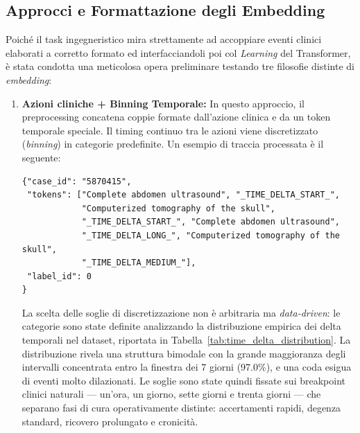 \subsection{Approcci e Formattazione degli Embedding}
Poiché il task ingegneristico mira strettamente ad accoppiare eventi clinici elaborati a corretto formato ed interfacciandoli poi col \textit{Learning} del Transformer, è stata condotta una meticolosa opera preliminare testando tre filosofie distinte di \textit{embedding}:

\begin{enumerate}
    \item \textbf{Azioni cliniche + Binning Temporale:} In questo approccio, il preprocessing concatena coppie formate dall'azione clinica e da un token temporale speciale. Il timing continuo tra le azioni viene discretizzato (\textit{binning}) in categorie predefinite. Un esempio di traccia processata è il seguente:
\begin{verbatim}
{"case_id": "5870415", 
 "tokens": ["Complete abdomen ultrasound", "_TIME_DELTA_START_", 
            "Computerized tomography of the skull", 
            "_TIME_DELTA_START_", "Complete abdomen ultrasound", 
            "_TIME_DELTA_LONG_", "Computerized tomography of the skull", 
            "_TIME_DELTA_MEDIUM_"], 
 "label_id": 0
}
\end{verbatim}

    La scelta delle soglie di discretizzazione non è arbitraria ma \textit{data-driven}: le categorie sono state definite analizzando la distribuzione empirica dei delta temporali nel dataset, riportata in Tabella~\ref{tab:time_delta_distribution}. La distribuzione rivela una struttura bimodale con la grande maggioranza degli intervalli concentrata entro la finestra dei 7 giorni (97.0\%), e una coda esigua di eventi molto dilazionati. Le soglie sono state quindi fissate sui breakpoint clinici naturali --- un'ora, un giorno, sette giorni e trenta giorni --- che separano fasi di cura operativamente distinte: accertamenti rapidi, degenza standard, ricovero prolungato e cronicità.


\end{enumerate}
